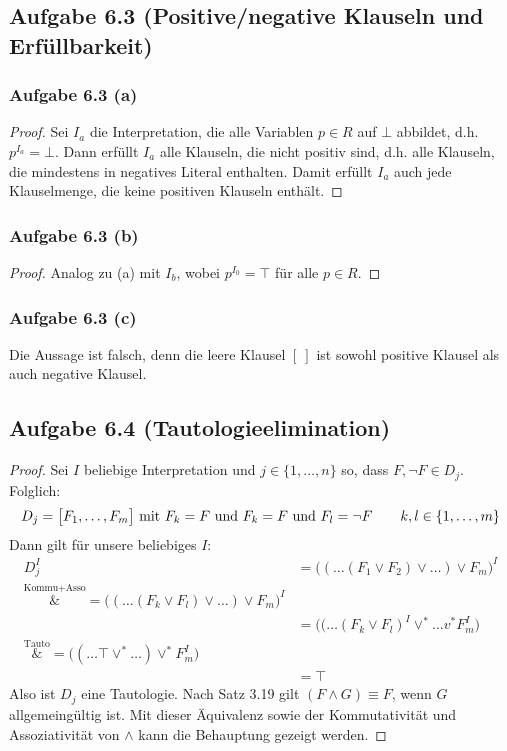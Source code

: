 \subsection{Aufgabe 6.3 (Positive/negative Klauseln und Erfüllbarkeit)}

\subsubsection{Aufgabe 6.3 (a)}


\begin{proof}
	Sei $I_a$ die Interpretation, die alle Variablen $p\in R$ auf $\bot$ abbildet, d.h. $p^{I_a}=\bot$. Dann erfüllt $I_a$ alle Klauseln, die nicht positiv sind, d.h. alle Klauseln, die mindestens in negatives Literal enthalten. 
	Damit erfüllt $I_a$ auch jede Klauselmenge, die keine positiven Klauseln enthält.
\end{proof}

\subsubsection{Aufgabe 6.3 (b)}

\begin{proof}
	Analog zu (a) mit $I_b$, wobei $p^{I_0}=\top$ für alle $p\in R$.
\end{proof}

\subsubsection{Aufgabe 6.3 (c)}
Die Aussage ist falsch, denn die leere Klausel $[~]$ ist sowohl positive Klausel als auch negative Klausel.

\subsection{Aufgabe 6.4 (Tautologieelimination)}

\begin{proof}
	Sei $I$ beliebige Interpretation und $j\in\lbrace1,\ldots,n\rbrace$ so, dass $F,\neg F\in D_j$. 		
	Folglich:
	\begin{align*}
		D_j=\big[F_1,\ldots,F_m\big]\mit F_k=F\text{ und }F_k=F\text{ und }F_l=\neg F\qquad k,l\in\lbrace1,\ldots,m\rbrace
	\end{align*}
	Dann gilt für unsere beliebiges $I$:
	\begin{align*}
		D_j^I&=\big((\ldots(F_1\vee F_2)\vee\ldots)\vee F_m\big)^I\\
		\overset{\text{Kommu+Asso}}&=
		\big((\ldots(F_k\vee F_l)\vee\ldots)\vee F_m\big)^I\\
		&=\big((\ldots(F_k\vee F_l)^I\vee^\ast\ldots v^\ast F_m^I\big)\\
		\overset{\text{Tauto}}&=
		\big((\ldots\top \vee^\ast\ldots)\vee^\ast F_m^I\big)\\
		&=\top
	\end{align*}
	Also ist $D_j$ eine Tautologie. 
	Nach Satz 3.19 gilt $(F\wedge G)\equiv F$, wenn $G$ allgemeingültig ist. 
	Mit dieser Äquivalenz sowie der Kommutativität und Assoziativität von $\wedge$ kann die Behauptung gezeigt werden.
\end{proof}

